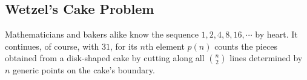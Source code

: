 \documentclass[twocolumn]{article}
\theoremstyle{definition}
\begin{document}

    \subsection*{Wetzel's Cake Problem}

        Mathematicians and bakers alike know the sequence $1, 2, 4, 8, 16, \cdots$
        by heart.  It continues, of course, with $31$, for its $n$th element $p(n)$
        counts the pieces obtained from a disk-shaped cake by cutting along all
        ${n\choose 2}$ lines determined by $n$ generic points on the
        cake's boundary.
\end{document}

